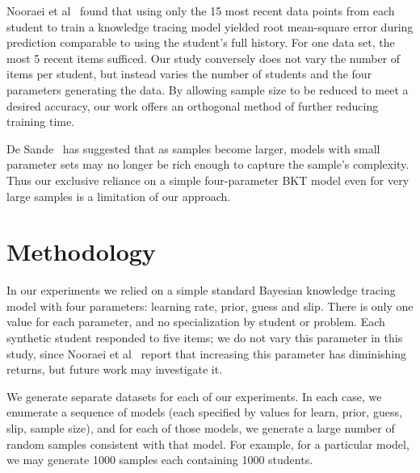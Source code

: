 \documentclass{edm_template}
\begin{document}
Nooraei et al~\cite{conf/edm/NooraeiPHB11} found that using only the 15 most recent data points from each student to train a knowledge tracing model yielded root mean-square error during prediction comparable to using the student's full history. For one data set, the most 5 recent items sufficed. Our study conversely does not vary the number of items per student, but instead varies the number of students and the four parameters generating the data. By allowing sample size to be reduced to meet a desired accuracy, our work offers an orthogonal method of further reducing training time.

De Sande~\cite{vandesande2013} has suggested that as samples become larger, models with small parameter sets  may no longer be rich enough to capture the sample's complexity. Thus our exclusive reliance on a simple four-parameter BKT model even for very large samples is a limitation of our approach.

\section{Methodology}

In our experiments we relied on a simple standard Bayesian knowledge tracing model with four parameters: learning rate, prior, guess and slip. There is only one value for each parameter, and no specialization by student or problem. Each synthetic student responded to five items; we do not vary this parameter in this study, since Nooraei et al~\cite{conf/edm/NooraeiPHB11} report that increasing this parameter has diminishing returns, but future work may investigate it.

We generate separate datasets for each of our experiments. In each case, we enumerate a sequence of models (each specified by values for learn, prior, guess, slip, sample size), and for each of those models, we generate a large number of random samples consistent with that model. For example, for a particular model, we may generate 1000 samples each containing 1000 students.
\end{document}
